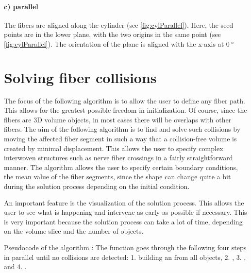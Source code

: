 \paragraph{c) parallel}
The fibers are aligned along the cylinder (see \cref{fig:cylParallel}).
Here, the seed points are in the lower plane, with the two origins in the same point (see \cref{fig:cylParallel}). The orientation of the plane is aligned with the x-axis at $\SI{0}{\degree}$
%
%
%
\section{Solving fiber collisions}
\label{sec:Solver}
%
The focus of the following algorithm is to allow the user to define any fiber path.
This allows for the greatest possible freedom in initialization.
Of course, since the fibers are 3D volume objects, in most cases there will be overlaps with other fibers.
The aim of the following algorithm is to find and solve such collisions by moving the affected fiber segment in such a way that a collision-free volume is created by minimal displacement.
This allows the user to specify complex interwoven structures such as nerve fiber crossings in a fairly straightforward manner.
The algorithm allows the user to specify certain boundary conditions, \eg{} the mean value of the fiber segments, since the shape can change quite a bit during the solution process depending on the initial condition.
\par
% 
An important feature is the visualization of the solution process.
This allows the user to see what is happening and intervene as early as possible if necessary.
This is very important because the solution process can take a lot of time, depending on the volume slice and the number of objects.
\par
%
Pseudocode of the algorithm : The function  goes through the following four steps in parallel until no collisions are detected: 1. building an  from all objects, 2. , 3. , and 4. .
%
%
% 
